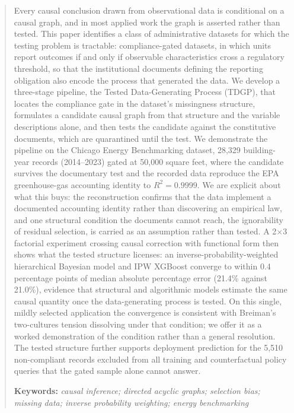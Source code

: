 \begin{abstract}
\noindent Every causal conclusion drawn from observational data is conditional on a causal graph, and in most applied work the graph is asserted rather than tested. This paper identifies a class of administrative datasets for which the testing problem is tractable: compliance-gated datasets, in which units report outcomes if and only if observable characteristics cross a regulatory threshold, so that the institutional documents defining the reporting obligation also encode the process that generated the data. We develop a three-stage pipeline, the Tested Data-Generating Process (TDGP), that locates the compliance gate in the dataset's missingness structure, formulates a candidate causal graph from that structure and the variable descriptions alone, and then tests the candidate against the constitutive documents, which are quarantined until the test. We demonstrate the pipeline on the Chicago Energy Benchmarking dataset, 28,329 building-year records (2014--2023) gated at 50,000 square feet, where the candidate survives the documentary test and the recorded data reproduce the EPA greenhouse-gas accounting identity to $R^2 = 0.9999$. We are explicit about what this buys: the reconstruction confirms that the data implement a documented accounting identity rather than discovering an empirical law, and one structural condition the documents cannot reach, the ignorability of residual selection, is carried as an assumption rather than tested. A 2$\times$3 factorial experiment crossing causal correction with functional form then shows what the tested structure licenses: an inverse-probability-weighted hierarchical Bayesian model and IPW XGBoost converge to within 0.4 percentage points of median absolute percentage error (21.4\% against 21.0\%), evidence that structural and algorithmic models estimate the same causal quantity once the data-generating process is tested. On this single, mildly selected application the convergence is consistent with Breiman's two-cultures tension dissolving under that condition; we offer it as a worked demonstration of the condition rather than a general resolution. The tested structure further supports deployment prediction for the 5,510 non-compliant records excluded from all training and counterfactual policy queries that the gated sample alone cannot answer.
\par\bigskip\noindent\textbf{Keywords:} \textit{causal inference; directed acyclic graphs; selection bias; missing data; inverse probability weighting; energy benchmarking}
\end{abstract}
